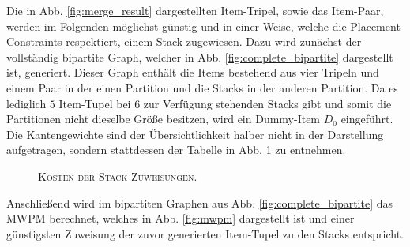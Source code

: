 Die in Abb. \ref{fig:merge_result} dargestellten Item-Tripel, sowie das Item-Paar, werden im Folgenden
möglichst günstig und in einer Weise, welche die Placement-Constraints respektiert, einem Stack zugewiesen.
Dazu wird zunächst der vollständig bipartite Graph, welcher in Abb. \ref{fig:complete_bipartite} dargestellt ist,
generiert. Dieser Graph enthält die Items bestehend aus vier Tripeln und einem Paar in der einen Partition
und die Stacks in der anderen Partition.
Da es lediglich $5$ Item-Tupel bei $6$ zur Verfügung stehenden Stacks gibt und somit die Partitionen nicht dieselbe
Größe besitzen, wird ein Dummy-Item $D_0$ eingeführt.
Die Kantengewichte sind der Übersichtlichkeit halber nicht in der Darstellung aufgetragen, sondern stattdessen
der Tabelle in Abb. \ref{fig:item_tuple_costs_three_cap} zu entnehmen.
\begin{figure}[H]
\centering
{}
\caption{\textsc{Kosten der Stack-Zuweisungen}.}
\label{fig:item_tuple_costs_three_cap}
\end{figure}

Anschließend wird im bipartiten Graphen aus Abb. \ref{fig:complete_bipartite} das \textsc{MWPM} berechnet, welches
in Abb. \ref{fig:mwpm} dargestellt ist und einer günstigsten Zuweisung der zuvor generierten Item-Tupel zu den Stacks entspricht.

